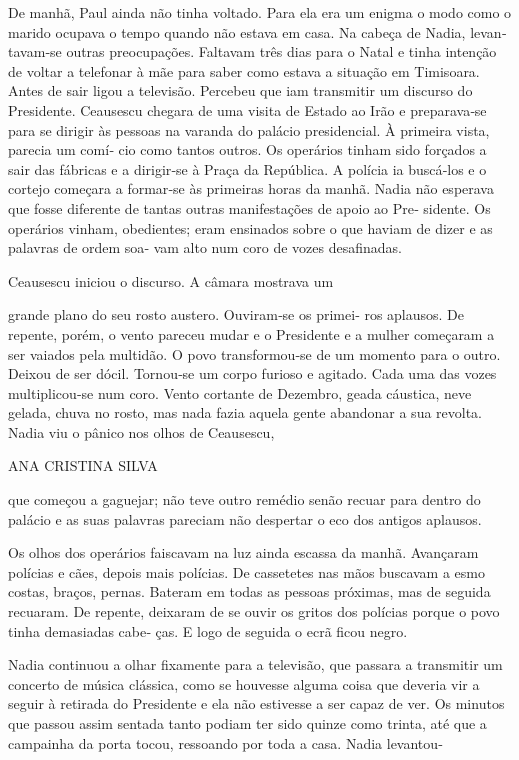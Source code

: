 De manhã, Paul ainda não tinha voltado. Para ela era um enigma o modo
como o marido ocupava o tempo quando não estava em casa. Na cabeça de
Nadia, levan‑ tavam‑se outras preocupações. Faltavam três dias para o
Natal e tinha intenção de voltar a telefonar à mãe para saber como
estava a situação em Timisoara. Antes de sair ligou a televisão.
Percebeu que iam transmitir um discurso do Presidente. Ceausescu chegara
de uma visita de Estado ao Irão e preparava‑se para se dirigir às
pessoas na varanda do palácio presidencial. À primeira vista, parecia um
comí‑ cio como tantos outros. Os operários tinham sido forçados a sair
das fábricas e a dirigir‑se à Praça da República. A polícia ia buscá‑los
e o cortejo começara a formar‑se às primeiras horas da manhã. Nadia não
esperava que fosse diferente de tantas outras manifestações de apoio ao
Pre‑ sidente. Os operários vinham, obedientes; eram ensinados sobre o
que haviam de dizer e as palavras de ordem soa‑ vam alto num coro de
vozes desafinadas.

Ceausescu iniciou o discurso. A câmara mostrava um

grande plano do seu rosto austero. Ouviram‑se os primei‑ ros aplausos.
De repente, porém, o vento pareceu mudar e o Presidente e a mulher
começaram a ser vaiados pela multidão. O povo transformou‑se de um
momento para o outro. Deixou de ser dócil. Tornou‑se um corpo furioso e
agitado. Cada uma das vozes multiplicou‑se num coro. Vento cortante de
Dezembro, geada cáustica, neve gelada, chuva no rosto, mas nada fazia
aquela gente abandonar a sua revolta. Nadia viu o pânico nos olhos de
Ceausescu,

ANA CRISTINA SILVA

que começou a gaguejar; não teve outro remédio senão recuar para dentro
do palácio e as suas palavras pareciam não despertar o eco dos antigos
aplausos.

Os olhos dos operários faiscavam na luz ainda escassa da manhã.
Avançaram polícias e cães, depois mais polícias. De cassetetes nas mãos
buscavam a esmo costas, braços, pernas. Bateram em todas as pessoas
próximas, mas de seguida recuaram. De repente, deixaram de se ouvir os
gritos dos polícias porque o povo tinha demasiadas cabe‑ ças. E logo de
seguida o ecrã ficou negro.

Nadia continuou a olhar fixamente para a televisão, que passara a
transmitir um concerto de música clássica, como se houvesse alguma coisa
que deveria vir a seguir à retirada do Presidente e ela não estivesse a
ser capaz de ver. Os minutos que passou assim sentada tanto podiam ter
sido quinze como trinta, até que a campainha da porta tocou, ressoando
por toda a casa. Nadia levantou‑

